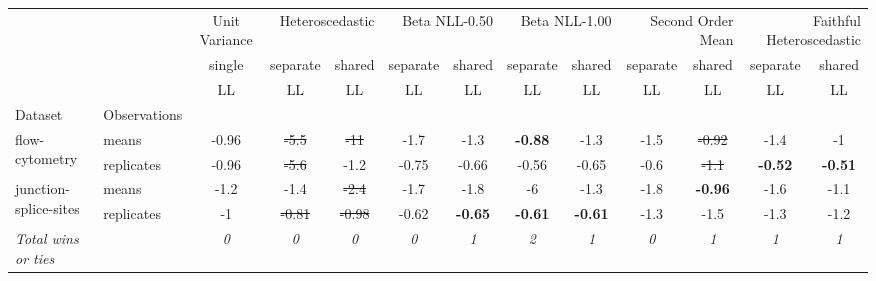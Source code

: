 \begin{tabular}{ll|c|cc|cc|cc|cc|cc}
\toprule
{} & {} & {Unit Variance} & \multicolumn{2}{r}{Heteroscedastic} & \multicolumn{2}{r}{Beta NLL-0.50} & \multicolumn{2}{r}{Beta NLL-1.00} & \multicolumn{2}{r}{Second Order Mean} & \multicolumn{2}{r}{Faithful Heteroscedastic} \\
{} & {} & {single} & {separate} & {shared} & {separate} & {shared} & {separate} & {shared} & {separate} & {shared} & {separate} & {shared} \\
{} & {} & {LL} & {LL} & {LL} & {LL} & {LL} & {LL} & {LL} & {LL} & {LL} & {LL} & {LL} \\
{Dataset} & {Observations} & {} & {} & {} & {} & {} & {} & {} & {} & {} & {} & {} \\
\midrule
\multirow[t]{2}{*}{flow-cytometry} & means & -0.96 & \sout{-5.5} & \sout{-11} & -1.7 & -1.3 & \textbf{-0.88} & -1.3 & -1.5 & \sout{-0.92} & -1.4 & -1 \\
 & replicates & -0.96 & \sout{-5.6} & -1.2 & -0.75 & -0.66 & -0.56 & -0.65 & -0.6 & \sout{-1.1} & \textbf{-0.52} & \textbf{-0.51} \\
\multirow[t]{2}{*}{junction-splice-sites} & means & -1.2 & -1.4 & \sout{-2.4} & -1.7 & -1.8 & -6 & -1.3 & -1.8 & \textbf{-0.96} & -1.6 & -1.1 \\
 & replicates & -1 & \sout{-0.81} & \sout{-0.98} & -0.62 & \textbf{-0.65} & \textbf{-0.61} & \textbf{-0.61} & -1.3 & -1.5 & -1.3 & -1.2 \\
\textit{{Total wins or ties}} &  & \textit{0} & \textit{0} & \textit{0} & \textit{0} & \textit{1} & \textit{2} & \textit{1} & \textit{0} & \textit{1} & \textit{1} & \textit{1} \\
\bottomrule
\end{tabular}
